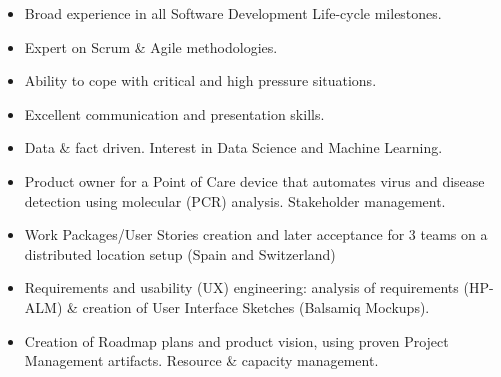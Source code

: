 \documentclass[10pt,a4paper]{altacv}
\begin{document}

\begin{fullwidth}
\makecvheader
\end{fullwidth}


\begin{itemize} 
	\item Broad experience in all Software Development Life-cycle milestones.
	\item Expert on Scrum \& Agile methodologies.
	\item Ability to cope with critical and high pressure situations.              
	\item Excellent communication and presentation skills.
	\item Data \& fact driven. Interest in Data Science and Machine Learning.
\end{itemize}

\medskip


\begin{itemize}
	\item Product owner for a Point of Care device that automates virus and disease detection using molecular (PCR) analysis. Stakeholder management.
	\item Work Packages/User Stories creation and later acceptance for 3 teams on a distributed location setup (Spain and Switzerland)
	\item Requirements and usability (UX) engineering: analysis of requirements (HP-ALM) \& creation of User Interface Sketches (Balsamiq Mockups).
	\item Creation of Roadmap plans and product vision, using proven Project Management artifacts. Resource \& capacity management.
\end{itemize}
\end{document}
